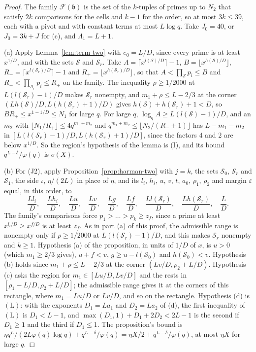 \documentclass[11pt]{article}
\theoremstyle{definition}
\begin{document}
\begin{proof}
The family $\mathcal F(\mathfrak b)$ is the set of the $k$-tuples of primes up to $N_2$ that satisfy $2k$
comparisons for the cells and $k - 1$ for the order, so at most $3k \le 39$, each with a pivot and with constant terms
at most $L \log q$.
Take $J_0 = 40$, or $J_0 = 3k + J$ for (c), and $\Lambda_1 = L + 1$.

(a) Apply Lemma~\ref{lem:term-two} with $e_0 = L/D$, since every prime is at least $x^{1/D}$, and with the sets
$\mathcal S$ and $\mathcal S_r$. Take $A = \lceil x^{l(\mathcal S)/D} \rceil - 1$, $B = \lfloor x^{h(\mathcal S)/D}
\rfloor$, $R_- = \lceil x^{l(\mathcal S_r)/D} \rceil - 1$ and $R_+ = \lfloor x^{h(\mathcal S_r)/D} \rfloor$, so that
$A < \prod_{\mathcal S} p_i \le B$ and $R_- < \prod_{\mathcal S_r} p_i \le R_+$ on the family. The inequality $\rho
\ge 1/2000$ at $L(l(\mathcal S_r) - 1)/D$ makes $\mathcal S_r$ nonempty, and $m_1 + \rho \le L - 2/3$ at the corner
$(Lh(\mathcal S)/D, L(h(\mathcal S_r) + 1)/D)$ gives $h(\mathcal S) + h(\mathcal S_r) + 1 < D$, so $BR_+ \le x^{1 -
1/D} \le N_1$ for large $q$. For large $q$, $\log_q A \ge L(l(\mathcal S) - 1)/D$, and an $m_2$ with $\lfloor N_1/R_+
\rfloor \le 4q^{m_1 + m_2}$ and $q^{m_1 + m_2} \le \lfloor N_2/(R_- + 1) \rfloor$ has $L - m_1 - m_2$ in
$[L(l(\mathcal S_r) - 1)/D, L(h(\mathcal S_r) + 1)/D]$, since the factors $4$ and $2$ are below $x^{1/D}$. So the
region's hypothesis of the lemma is (I), and its bound $q^{L - \delta}/\varphi(q)$ is $o(X)$.

(b) For (J2), apply Proposition~\ref{prop:harman-two} with $j = k$, the sets $\mathcal S_0$, $\mathcal S_r$ and
$\mathcal S_1$, the side $\iota$, $\eta/(2L)$ in place of $\eta$, and its $l_i$, $h_i$, $u$, $v$, $t$, $a_0$, $\rho_1$,
$\rho_2$ and margin $\varepsilon$ equal, in this order, to
\[
  \frac{Ll_i}D, \quad \frac{Lh_i}D, \quad \frac{Lu}D, \quad \frac{Lv}D, \quad \frac{Lg}D, \quad \frac{Lf}D, \quad
  \frac{Ll(\mathcal S_r)}D, \quad \frac{Lh(\mathcal S_r)}D, \quad \frac LD.
\] The family's comparisons force $p_1 > \dots > p_k \ge z_f$, since a prime at least $x^{l_i/D} \ge x^{f/D}$ is
at least $z_f$. As in part (a) of this proof, the admissible range is nonempty only if $\rho \ge 1/2000$ at
$L(l(\mathcal S_r) - 1)/D$, and this makes $\mathcal S_r$ nonempty and $k \ge 1$. Hypothesis (a) of the proposition,
in units of $1/D$ of $x$, is $u > 0$ (which $m_1 \ge 2/3$ gives), $u + f < v$, $g \ge u - l(\mathcal S_0)$ and
$h(\mathcal S_0) < v$.
Hypothesis (b) holds since $m_1 + \rho \le L - 2/3$ at the corner $(Lv/D, \rho_2 + L/D)$. Hypothesis (c) asks the
region for $m_1 \in [Lu/D, Lv/D]$ and the rests in $[\rho_1 - L/D, \rho_2 + L/D]$; the admissible range gives it at
the corners of this rectangle, where $m_1 = Lu/D$ or $Lv/D$, and so on the rectangle. Hypothesis (d) is $(\mathrm L)$:
with the exponents $D_1 = La_1$ and $D_2 = La_2$ of (d), the first inequality of $(\mathrm L)$ is $D_1 < L - 1$, and
$\max(D_1, 1) + D_1 + 2D_2 < 2L - 1$ is the second if $D_1 \ge 1$ and the third if $D_1 \le 1$. The proposition's bound
is $\eta q^L/(2L\varphi(q) \log q) + q^{L - \delta}/\varphi(q) = \eta X/2 + q^{L - \delta}/\varphi(q)$, at most $\eta X$
for large $q$.


\end{proof}
\end{document}
